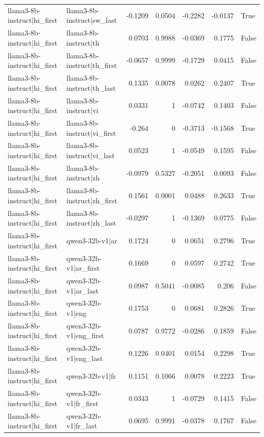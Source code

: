 \begin{table}
\begin{tabular}{l l r r r r l}
llama3-8b-instruct|hi_first & llama3-8b-instruct|sw_last & -0.1209 & 0.0504 & -0.2282 & -0.0137 & True \\
llama3-8b-instruct|hi_first & llama3-8b-instruct|th & 0.0703 & 0.9988 & -0.0369 & 0.1775 & False \\
llama3-8b-instruct|hi_first & llama3-8b-instruct|th_first & -0.0657 & 0.9999 & -0.1729 & 0.0415 & False \\
llama3-8b-instruct|hi_first & llama3-8b-instruct|th_last & 0.1335 & 0.0078 & 0.0262 & 0.2407 & True \\
llama3-8b-instruct|hi_first & llama3-8b-instruct|vi & 0.0331 & 1 & -0.0742 & 0.1403 & False \\
llama3-8b-instruct|hi_first & llama3-8b-instruct|vi_first & -0.264 & 0 & -0.3713 & -0.1568 & True \\
llama3-8b-instruct|hi_first & llama3-8b-instruct|vi_last & 0.0523 & 1 & -0.0549 & 0.1595 & False \\
llama3-8b-instruct|hi_first & llama3-8b-instruct|zh & -0.0979 & 0.5327 & -0.2051 & 0.0093 & False \\
llama3-8b-instruct|hi_first & llama3-8b-instruct|zh_first & 0.1561 & 0.0001 & 0.0488 & 0.2633 & True \\
llama3-8b-instruct|hi_first & llama3-8b-instruct|zh_last & -0.0297 & 1 & -0.1369 & 0.0775 & False \\
llama3-8b-instruct|hi_first & qwen3-32b-v1|ar & 0.1724 & 0 & 0.0651 & 0.2796 & True \\
llama3-8b-instruct|hi_first & qwen3-32b-v1|ar_first & 0.1669 & 0 & 0.0597 & 0.2742 & True \\
llama3-8b-instruct|hi_first & qwen3-32b-v1|ar_last & 0.0987 & 0.5041 & -0.0085 & 0.206 & False \\
llama3-8b-instruct|hi_first & qwen3-32b-v1|eng & 0.1753 & 0 & 0.0681 & 0.2826 & True \\
llama3-8b-instruct|hi_first & qwen3-32b-v1|eng_first & 0.0787 & 0.9772 & -0.0286 & 0.1859 & False \\
llama3-8b-instruct|hi_first & qwen3-32b-v1|eng_last & 0.1226 & 0.0401 & 0.0154 & 0.2298 & True \\
llama3-8b-instruct|hi_first & qwen3-32b-v1|fr & 0.1151 & 0.1066 & 0.0078 & 0.2223 & True \\
llama3-8b-instruct|hi_first & qwen3-32b-v1|fr_first & 0.0343 & 1 & -0.0729 & 0.1415 & False \\
llama3-8b-instruct|hi_first & qwen3-32b-v1|fr_last & 0.0695 & 0.9991 & -0.0378 & 0.1767 & False \\

\end{tabular}
\end{table}
